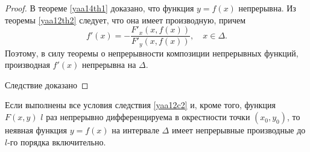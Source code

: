\begin{proof}
В теореме \ref{yaa14th1} доказано, что функция $y=f(x)$ непрерывна. Из теоремы \ref{yaa12th2} следует, что она имеет производную, причем
$$
f'(x)=-\frac{F'_x(x,f(x))}{F'_y(x,f(x))},\quad x\in\Delta.
$$
Поэтому, в силу теоремы о непрерывности композиции непрерывных функций, производная $f'(x)$ непрерывна на $\Delta$.

Следствие доказано
\end{proof}

\begin{cons}
Если выполнены все условия следствия \ref{yaa12c2} и, кроме того, функция $F(x,y)$ $l$ раз непрерывно дифференцируема в окрестности точки $(x_0,y_0)$, то неявная функция $y=f(x)$ на интервале $\Delta$ имеет непрерывные производные до $l$-го порядка включительно.
\end{cons}